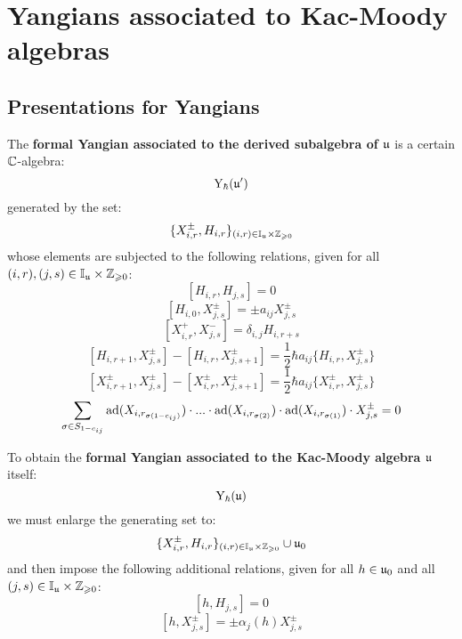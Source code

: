 \section{Yangians associated to Kac-Moody algebras} \label{section: yangians_of_kac_moody_algebras}
    \subsection{Presentations for Yangians}
        \begin{definition} \label{def: formal_yangians_associated_to_symmetrisable_kac_moody_algebras}
            The \textbf{formal Yangian associated to the derived subalgebra of $\mathfrak{u}$} is a certain $\mathbb{C}$-algebra:
                $$\mathrm{Y}_{\hbar}(\mathfrak{u}')$$
            generated by the set:
                $$\{X_{i, r}^{\pm}, H_{i, r}\}_{(i, r) \in \simpleroots_{\fraku} \x \Z_{\geq 0}}$$
            whose elements are subjected to the following relations, given for all $(i, r), (j, s) \in \simpleroots_{\fraku} \x \Z_{\geq 0}$:
                $$[H_{i, r}, H_{j, s}] = 0$$
                $$[H_{i, 0}, X_{j, s}^{\pm}] = \pm a_{ij} X_{j, s}^{\pm}$$
                $$[X_{i, r}^+, X_{j, s}^-] = \delta_{i, j} H_{i, r + s}$$
                $$[H_{i, r + 1}, X^{\pm}_{j, s}] - [H_{i, r}, X^{\pm}_{j, s + 1}] = \frac12 \hbar a_{ij} \{H_{i, r}, X^{\pm}_{j, s}\}$$
                $$[X^{\pm}_{i, r + 1}, X^{\pm}_{j, s}] - [X^{\pm}_{i, r}, X^{\pm}_{j, s + 1}] = \frac12 \hbar a_{ij} \{X^{\pm}_{i, r}, X^{\pm}_{j, s}\}$$
                $$\sum_{ \sigma \in S_{1 - c_{ij}} } \mathrm{ad}(X_{ i, r_{\sigma(1 - c_{ij})} }) \cdot ... \cdot \mathrm{ad}(X_{ i, r_{\sigma(2)} }) \cdot \mathrm{ad}(X_{ i, r_{\sigma(1)} }) \cdot X_{j, s}^{\pm} = 0$$
                
            To obtain the \textbf{formal Yangian associated to the Kac-Moody algebra $\mathfrak{u}$} itself:
                $$\mathrm{Y}_{\hbar}(\mathfrak{u})$$
            we must enlarge the generating set to:
                $$\{X_{i, r}^{\pm}, H_{i, r}\}_{(i, r) \in \simpleroots_{\fraku} \x \Z_{\geq 0}} \cup \fraku_0$$
            and then impose the following additional relations, given for all $h \in \mathfrak{u}_0$ and all $(j, s) \in \simpleroots_{\fraku} \x \Z_{\geq 0}$:
                $$[h, H_{j, s}] = 0$$
                $$[h, X_{j, s}^{\pm}] = \pm \alpha_j(h) X_{j, s}^{\pm}$$
        \end{definition}
